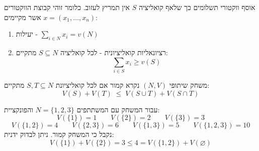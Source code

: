 \documentclass{tstextbook}
\begin{document}
\begin{definition}
אוסף ווקטורי תשלומים כך שלאף קואליציה \(S\) אין תמריץ לעזוב. כלומר זוהי קבוצת הווקטורים \(x=\left( x_{1},\dots,x_{n} \right)\) אשר מקיימים:

  \begin{enumerate}
    \item יעילות - \(\sum_{i\in N}x_{i}=v(N)\)


    \item רציונאליות קואליציונית - לכל קואליציה \(S\subseteq N\) מתקיים: 
$$\sum_{i\in S}x_{i}\geq v(S)$$


  \end{enumerate}
\end{definition}
\begin{definition}
משחק שיתופי \((N,V)\) נקרא קמור אם לכל קואליציונת \(S,T\subseteq N\) מתקיים:
$$V(S)+V(T)\;\leq\;V(S\cup T)+V(S\cap T)$$

\end{definition}
עבור המשחק עם המשתתפים \(N=\{ 1,2,3 \}\) והפונקציית:
$$V\left( \{ 1 \} \right)=1\qquad V\left( \{ 2 \} \right)=2\qquad V\left( \{ 3 \} \right)=3$$$$V\left( \{ 1,2 \} \right)=4\qquad V\left( \{ 2,3 \} \right)=6\qquad V\left( \{ 1,3 \} \right)=5\qquad V\left( \{ 1,2,3 \} \right)=10$$
נקבל כי המשחק קמור. ניתן לבדוק ידנית:
$$V\left( \{ 1 \} \right)+V\left( \{ 2 \} \right)=3 \leq 4=V\left( \{ 1,2 \} \right)+V\left( \varnothing  \right)$$
\end{document}
